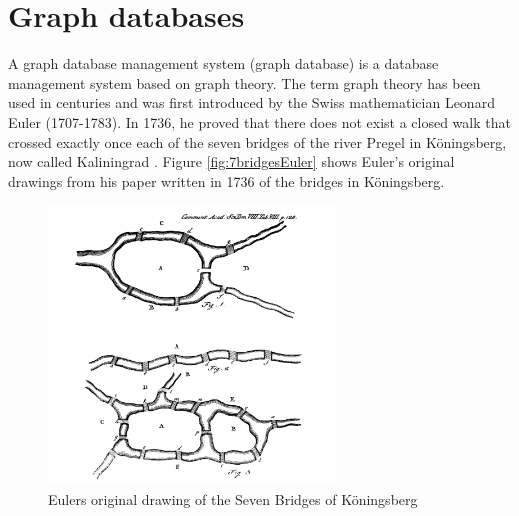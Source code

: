 \section{Graph databases}
\label{sec:graphdb}
A graph database management system (graph database) \citep{robinson13} is a database management system based on graph theory. The term graph theory has been used in centuries and was first introduced by the Swiss mathematician Leonard Euler (1707-1783). In 1736, he proved that there does not exist a closed walk that crossed exactly once each of the seven bridges of the river Pregel in Köningsberg, now called Kaliningrad \citep{alexanderson06}. Figure \vref{fig:7bridgesEuler} shows Euler's original drawings from his paper written in 1736 \citep{euler1741} of the bridges in Köningsberg. 

\begin{figure}[H]
  \centering
  \includegraphics[width=3in]{assets/7bridges-euler.png}
  \caption{Eulers original drawing of the Seven Bridges of Köningsberg} 
  \label{fig:7bridgesEuler}
\end{figure}


